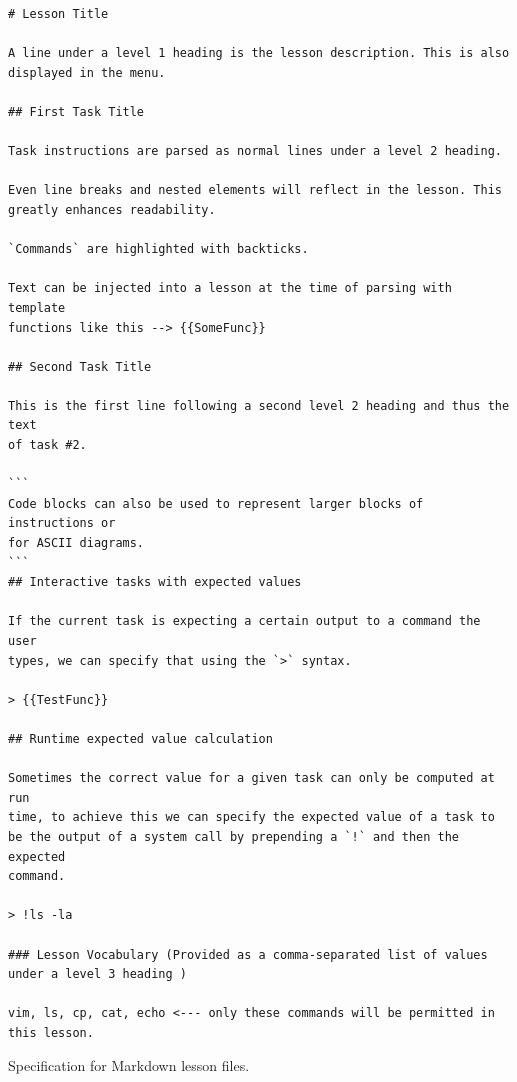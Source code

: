 \begin{listing}
\begin{verbatim}
# Lesson Title

A line under a level 1 heading is the lesson description. This is also
displayed in the menu.

## First Task Title

Task instructions are parsed as normal lines under a level 2 heading.

Even line breaks and nested elements will reflect in the lesson. This
greatly enhances readability.

`Commands` are highlighted with backticks.

Text can be injected into a lesson at the time of parsing with template
functions like this --> {{SomeFunc}}

## Second Task Title

This is the first line following a second level 2 heading and thus the text
of task #2.

```
Code blocks can also be used to represent larger blocks of instructions or
for ASCII diagrams.
```
## Interactive tasks with expected values

If the current task is expecting a certain output to a command the user 
types, we can specify that using the `>` syntax.

> {{TestFunc}}

## Runtime expected value calculation

Sometimes the correct value for a given task can only be computed at run 
time, to achieve this we can specify the expected value of a task to 
be the output of a system call by prepending a `!` and then the expected
command.

> !ls -la

### Lesson Vocabulary (Provided as a comma-separated list of values under a level 3 heading )

vim, ls, cp, cat, echo <--- only these commands will be permitted in this lesson.
\end{verbatim}
    \caption{Specification for Markdown lesson files.}
    \label{lst:markdown}
\end{listing}
